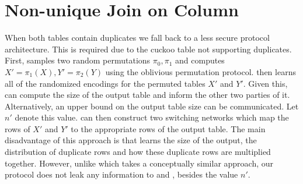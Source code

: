 \iffullversion
\else

\ifccs
\section{Non-unique Join on Column}\label{sec:nonunique}
When both tables contain duplicates we fall back to a less secure protocol architecture. This is required due to the cuckoo table not supporting duplicates. First,  samples two random permutations $\pi_0,\pi_1$ and computes $X'=\pi_1(X),Y'=\pi_2(Y)$ using the oblivious permutation protocol.  then learns all of the randomized encodings for the permuted tables $X'$ and $Y'$. Given this,  can compute the size of the output table and inform the other two parties of it. Alternatively, an upper bound on the output table size can be communicated. Let $n'$ denote this value.  can then construct two switching networks which map the rows of $X'$ and $Y'$ to the appropriate rows of the output table. The main disadvantage of this approach is that  learns the size of the output, the distribution of duplicate rows and how these duplicate rows are multiplied together. However, unlike \cite{LTW13} which takes a conceptually similar approach, our protocol does not leak any information to  and , besides the value $n'$.
\fi

